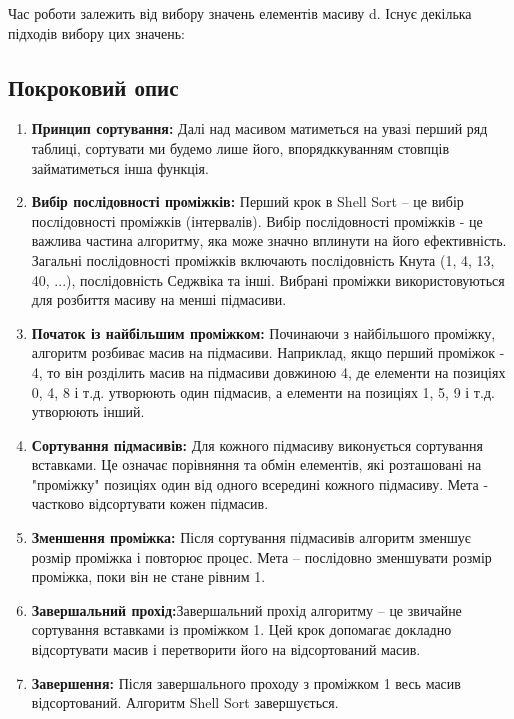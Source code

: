 \documentclass[12pt]{extarticle}
\begin{document}
Час роботи залежить від вибору значень елементів масиву d. Існує декілька підходів вибору цих значень:
\subsection*{Покроковий опис}

\begin{enumerate}

\item \textbf{Принцип сортування:} Далі над масивом матиметься на увазі перший
ряд таблиці, сортувати ми будемо лише його, впорядккуванням стовпців займатиметься інша функція. 

\item \textbf{Вибір послідовності проміжків:} Перший крок в Shell Sort -- це 
вибір послідовності проміжків (інтервалів). Вибір послідовності 
проміжків - це важлива частина алгоритму, яка може значно вплинути 
на його ефективність. Загальні послідовності проміжків включають 
послідовність Кнута (1, 4, 13, 40, ...), послідовність Седжвіка та 
інші. Вибрані проміжки використовуються для розбиття масиву на менші
 підмасиви.
\item \textbf{Початок із найбільшим проміжком:}  Починаючи з найбільшого проміжку,
 алгоритм розбиває масив на підмасиви. Наприклад, якщо перший проміжок
  - 4, то він розділить масив на підмасиви довжиною 4, де елементи на
   позиціях 0, 4, 8 і т.д. утворюють один підмасив, а елементи на позиціях
    1, 5, 9 і т.д. утворюють інший.
\item \textbf{Сортування підмасивів:} Для кожного підмасиву виконується сортування 
вставками. Це означає порівняння та обмін елементів, які розташовані 
на "проміжку" позиціях один від одного всередині кожного підмасиву.
 Мета - частково відсортувати кожен підмасив.

\item \textbf{Зменшення проміжка:} Після сортування 
підмасивів алгоритм зменшує розмір проміжка і повторює процес. Мета --
 послідовно зменшувати розмір проміжка, поки він не стане рівним 1.
\item \textbf{Завершальний прохід:}Завершальний прохід алгоритму -- це звичайне 
сортування вставками із проміжком 1. Цей крок допомагає докладно 
відсортувати масив і перетворити його на відсортований масив.

\item \textbf{Завершення:}  Після завершального проходу з проміжком 1 
весь масив відсортований. Алгоритм Shell Sort завершується.
\end{enumerate}
\end{document}
